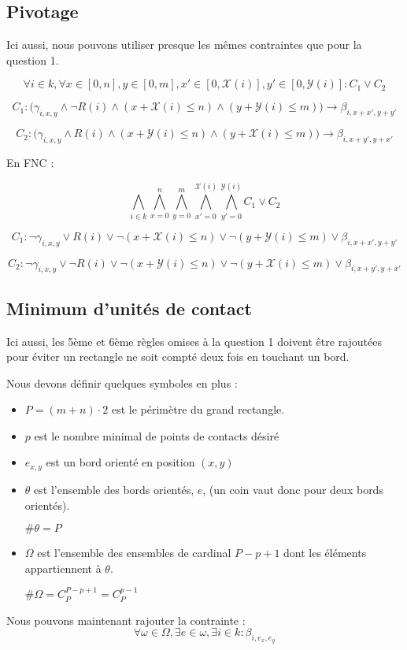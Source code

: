 \documentclass[a4paper]{article}
\begin{document}
\subsection{Pivotage}

Ici aussi, nous pouvons utiliser presque les mêmes contraintes que pour la question 1.

$$
\forall i \in k,
\forall x \in [0, n] , y \in [0, m],
x' \in [0, \mathcal{X}(i)], y' \in [0, \mathcal{Y}(i)] : C_1 \lor C_2
$$

$$
C_1 : \Big(
\gamma_{i, x, y} \land \lnot R(i)
\land (x + \mathcal{X}(i) \leq n)
\land (y + \mathcal{Y}(i) \leq m)
\Big)
\rightarrow \beta_{i, x + x', y + y'}
$$

$$
C_2 : \Big(
\gamma_{i, x, y} \land R(i)
\land (x + \mathcal{Y}(i) \leq n)
\land (y + \mathcal{X}(i) \leq m)
\Big)
\rightarrow \beta_{i, x + y', y + x'}
$$

En FNC :

$$
\bigwedge_{i \in k}
\bigwedge_{x=0}^{n} \bigwedge_{y=0}^{m}
\bigwedge_{x'=0}^{\mathcal{X}(i)} \bigwedge_{y'=0}^{\mathcal{Y}(i)} C_1 \lor C_2
$$

$$
C_1 :
\lnot \gamma_{i, x, y} \lor R(i)
\lor \lnot (x + \mathcal{X}(i) \leq n)
\lor \lnot (y + \mathcal{Y}(i) \leq m)
\lor \beta_{i, x + x', y + y'}
$$

$$
C_2 :
\lnot \gamma_{i, x, y} \lor \lnot R(i)
\lor \lnot (x + \mathcal{Y}(i) \leq n)
\lor \lnot (y + \mathcal{X}(i) \leq m)
\lor \beta_{i, x + y', y + x'}
$$


\subsection{Minimum d'unités de contact}

Ici aussi, les 5ème et 6ème règles omises à la question 1 doivent être rajoutées pour éviter un rectangle ne soit compté deux fois en touchant un bord.

Nous devons définir quelques symboles en plus :
\begin{itemize}
  \item $P = (m + n) \cdot 2$ est le périmètre du grand rectangle.
  \item $p$ est le nombre minimal de points de contacts désiré
  \item $e_{x,y}$ est un bord orienté en position $(x,y)$
  \item $\theta$ est l'ensemble des bords orientés, $e$,  (un coin vaut donc pour deux bords orientés).

  $\#\theta = P$
  \item $\Omega$ est l'ensemble des ensembles de cardinal $P-p+1$ dont les éléments appartiennent à $\theta$.

  $\#\Omega = C_P^{P-p+1} = C_P^{p-1}$
\end{itemize}
\vspace{1em}
Nous pouvons maintenant rajouter la contrainte : $$
\forall \omega \in \Omega, \exists e \in \omega, \exists i \in k : \beta_{i, e_x, e_y}
$$
\end{document}
